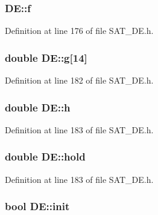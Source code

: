 \hypertarget{classDE_afa7fefa0ba10ee635a618b3a4a5a39dc}{
\subsubsection[{f}]{ D\-E\-::f\hspace{0.3cm}{\ttfamily [private]}}}\label{classDE_afa7fefa0ba10ee635a618b3a4a5a39dc}


Definition at line 176 of file S\-A\-T\-\_\-\-D\-E.\-h.

\hypertarget{classDE_aa5b66f7465475382f7f2d757fd9cf979}{
\subsubsection[{g}]{\setlength{\rightskip}{0pt plus 5cm}double D\-E\-::g\mbox{[}14\mbox{]}\hspace{0.3cm}{\ttfamily [private]}}}\label{classDE_aa5b66f7465475382f7f2d757fd9cf979}


Definition at line 182 of file S\-A\-T\-\_\-\-D\-E.\-h.

\hypertarget{classDE_adcd1d27f91dc1de8c4e2e8572878f92f}{
\subsubsection[{h}]{\setlength{\rightskip}{0pt plus 5cm}double D\-E\-::h\hspace{0.3cm}{\ttfamily [private]}}}\label{classDE_adcd1d27f91dc1de8c4e2e8572878f92f}


Definition at line 183 of file S\-A\-T\-\_\-\-D\-E.\-h.

\hypertarget{classDE_a8aba1f4cf3cb574060e0772052b6772e}{
\subsubsection[{hold}]{\setlength{\rightskip}{0pt plus 5cm}double D\-E\-::hold\hspace{0.3cm}{\ttfamily [private]}}}\label{classDE_a8aba1f4cf3cb574060e0772052b6772e}


Definition at line 183 of file S\-A\-T\-\_\-\-D\-E.\-h.

\hypertarget{classDE_a992636687bf14328677c450008855770}{
\subsubsection[{init}]{\setlength{\rightskip}{0pt plus 5cm}bool D\-E\-::init\hspace{0.3cm}{\ttfamily [private]}}}\label{classDE_a992636687bf14328677c450008855770}


